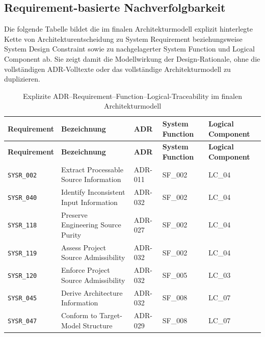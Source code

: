 \subsection{Requirement-basierte Nachverfolgbarkeit}
\label{app:adr_requirement_traceability}

Die folgende Tabelle bildet die im finalen Architekturmodell explizit
hinterlegte Kette von Architekturentscheidung zu System Requirement
beziehungsweise System Design Constraint sowie zu nachgelagerter System
Function und Logical Component ab. Sie zeigt damit die Modellwirkung der
Design-Rationale, ohne die vollständigen ADR-Volltexte oder das vollständige
Architekturmodell zu duplizieren.

\begingroup
\scriptsize
\begin{xltabular}{\textwidth}{@{}p{1.65cm}X p{2.25cm}p{2.0cm}p{1.7cm}@{}}
\caption[ADR--Requirement--Function--Logical-Traceability]{Explizite ADR--Requirement--Function--Logical-Traceability im finalen Architekturmodell}
\label{tab:adr_requirement_traceability}\\
\hline
\textbf{Requirement} & \textbf{Bezeichnung} & \textbf{ADR} & \textbf{System Function} & \textbf{Logical Component}\\
\hline
\endfirsthead
\hline
\textbf{Requirement} & \textbf{Bezeichnung} & \textbf{ADR} & \textbf{System Function} & \textbf{Logical Component}\\
\hline
\endhead

\texttt{SYSR\_002} & Extract Processable Source Information & ADR-011 & SF\_002 & LC\_04\\

\texttt{SYSR\_040} & Identify Inconsistent Input Information & ADR-032 & SF\_002 & LC\_04\\

\texttt{SYSR\_118} & Preserve Engineering Source Purity & ADR-027 & SF\_002 & LC\_04\\

\texttt{SYSR\_119} & Assess Project Source Admissibility & ADR-032 & SF\_002 & LC\_04\\

\texttt{SYSR\_120} & Enforce Project Source Admissibility & ADR-032 & SF\_005 & LC\_03\\

\texttt{SYSR\_045} & Derive Architecture Information & ADR-032 & SF\_008 & LC\_07\\

\texttt{SYSR\_047} & Conform to Target-Model Structure & ADR-029 & SF\_008 & LC\_07\\


\end{xltabular}
